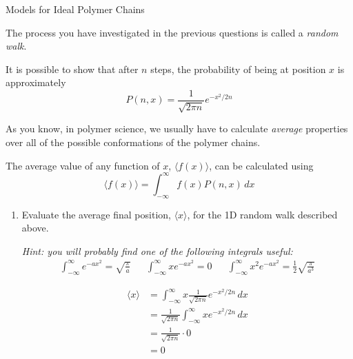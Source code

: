 \begin{activity}{Models for Ideal Polymer Chains}
\begin{ctqs}
\end{ctqs}

\begin{infobox}
	
	The process you have investigated in the previous questions is called a \emph{random walk}.
	
	It is possible to show that after $n$ steps, the probability of being at position $x$ is approximately
	\begin{equation*}
		P(n,x) = \frac{1}{\sqrt{2\pi n}}e^{-x^2/2n}
	\end{equation*}
	
\end{infobox}

\begin{ctqs}

	\question As you know, in polymer science, we usually have to calculate \emph{average} properties over all of the possible conformations of the polymer chains.
	
		The average value of any function of $x$, $\langle f(x)\rangle$, can be calculated using
		\begin{equation*}
			\langle f(x) \rangle = \int_{-\infty}^\infty f(x) P(n,x)\,dx
		\end{equation*}
		
		\begin{enumerate}
			\item Evaluate the average final position, $\langle x \rangle$, for the 1D random walk described above.
			
				\emph{Hint: you will probably find one of the following integrals useful:}
				\begin{align*}
					\int_{-\infty}^\infty e^{-a x^2} = \sqrt{\frac{\pi}{a}} && \int_{-\infty}^\infty x e^{-a x^2} = 0 && \int_{-\infty}^\infty x^2 e^{-a x^2} = \frac{1}{2}\sqrt{\frac{\pi}{a^3}}
				\end{align*}
				
				\begin{solution}[1.5in]
					\begin{align*}
						\langle x \rangle &= \int_{-\infty}^\infty x \frac{1}{\sqrt{2\pi n}}e^{-x^2/2n}\, dx\\
						&= \frac{1}{\sqrt{2\pi n}} \int_{-\infty}^\infty x e^{-x^2/2n}\, dx\\
						&= \frac{1}{\sqrt{2\pi n}} \cdot 0\\
						&= 0
					\end{align*}
				\end{solution}
				

\end{enumerate}
\end{ctqs}
\end{activity}
